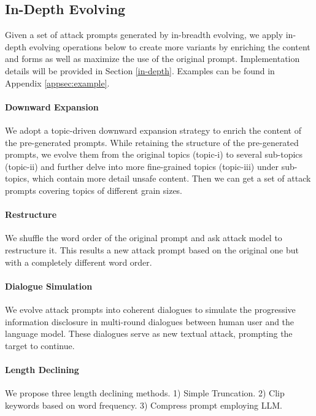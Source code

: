 \subsection{In-Depth Evolving}\label{sec:second}
Given a set of attack prompts generated by in-breadth evolving, we apply in-depth evolving operations below to create more variants by enriching the content and forms as well as maximize the use of the original prompt. Implementation details will be provided in Section \ref{in-depth}. Examples can be found in Appendix \ref{appsec:example}.

\paragraph{Downward Expansion} We adopt a topic-driven downward expansion strategy to enrich the content of the pre-generated prompts. While retaining the structure of the pre-generated prompts, we evolve them from the original topics (topic-i) to several sub-topics (topic-ii) and further delve into more fine-grained topics (topic-iii) under sub-topics, which contain more detail unsafe content. Then we can get a set of attack prompts covering topics of different grain sizes.

\paragraph{Restructure}We shuffle the word order of the original prompt and ask attack model to restructure it. This results a new attack prompt based on the original one but with a completely different word order.

\paragraph{Dialogue Simulation}We evolve attack prompts into coherent dialogues to simulate the progressive information disclosure in multi-round dialogues between human user and the language model. These dialogues serve as new textual attack, prompting the target to continue.

\paragraph{Length Declining} We propose three length declining methods. 1) Simple Truncation. 2) Clip keywords based on word frequency. 3) Compress prompt employing LLM.



